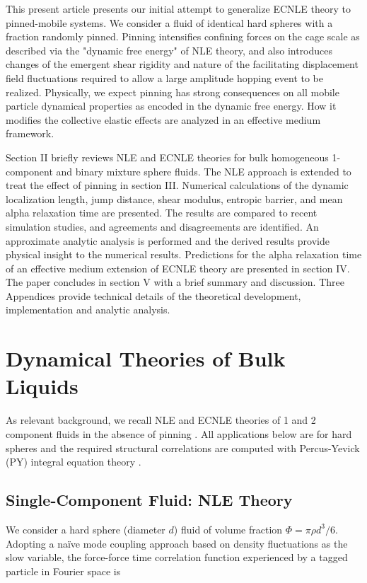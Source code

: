 \documentclass[twocolumn,showpacs,preprintnumbers,amsmath,amssymb,unsortedaddress,
]{revtex4-1}
\begin{document}
This present article presents our initial attempt to generalize ECNLE theory to pinned-mobile systems. We consider a fluid of identical hard spheres with a fraction   randomly pinned. Pinning intensifies confining forces on the cage scale as described via the "dynamic free energy" of NLE theory, and also introduces changes of the emergent shear rigidity and nature of the facilitating displacement field fluctuations required to allow a large amplitude hopping event to be realized. Physically, we expect pinning has strong consequences on all mobile particle dynamical properties as encoded in the dynamic free energy. How it modifies the collective elastic effects are analyzed in an effective medium framework. 

Section II briefly reviews NLE and ECNLE theories for bulk homogeneous 1-component and binary mixture sphere fluids. The NLE approach is extended to treat the effect of pinning in section III. Numerical calculations of the dynamic localization length, jump distance, shear modulus, entropic barrier, and mean alpha relaxation time are presented. The results are compared to recent simulation studies, and agreements and disagreements are identified. An approximate analytic analysis is performed and the derived results provide physical insight to the numerical results. Predictions for the alpha relaxation time of an effective medium extension of ECNLE theory are presented in section IV. The paper concludes in section V with a brief summary and discussion. Three Appendices provide technical details of the theoretical development, implementation and analytic analysis. 
\section{Dynamical Theories of Bulk Liquids}
As relevant background, we recall NLE and ECNLE theories of 1 and 2 component fluids in the absence of pinning \cite{7,34}.  All applications below are for hard spheres and the required structural correlations are computed with Percus-Yevick (PY) integral equation theory \cite{35}.
\subsection{Single-Component Fluid: NLE Theory}
We consider a hard sphere (diameter $d$) fluid of volume fraction $\Phi=\pi\rho d^3/6$. Adopting a {na\"ive} mode coupling approach based on density fluctuations as the slow variable, the force-force time correlation function experienced by a tagged particle in Fourier space is \cite{13,33,36,37}
\end{document}
